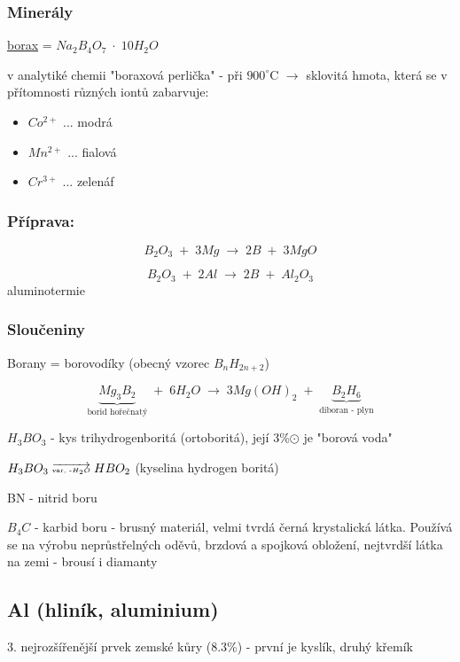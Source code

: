 \subsubsection{Minerály}

\underline{borax} = $Na_2B_4O_7 \; \cdot \; 10H_2O$

v analytiké chemii "boraxová perlička" - při $900^\circ$C $\rightarrow$ sklovitá hmota,
která se v přítomnosti různých iontů zabarvuje:
\begin{itemize}
    \item $Co^{2+}$ ... modrá
    \item $Mn^{2+}$ ... fialová
    \item $Cr^{3+}$ ... zelenáf
\end{itemize}

\subsubsection*{Příprava:}
\[B_2O_3 \; + \; 3Mg \; \longrightarrow \; 2B \; + \; 3MgO\]

\[B_2O_3 \; + \; 2Al \; \longrightarrow \; 2B \; + \; Al_2O_3\] \centering aluminotermie

\raggedright
\subsubsection*{Sloučeniny}
Borany = borovodíky (obecný vzorec $B_nH_{2n+2}$)

\[\underbrace{Mg_3B_2}_\text{borid hořečnatý} \; + \; 6H_2O \; \longrightarrow \; 3Mg\left(OH\right)_2 \; + \; \underbrace{B_2H_6}_\text{diboran - plyn}\]
\smallskip

$H_3BO_3$ - kys trihydrogenboritá (ortoboritá), její 3\%$\odot$ je "borová voda"
\smallskip

$H_3BO_3 \; \overrightarrow{\text{\tiny{var, -$H_2O$}}} \; HBO_2$ (kyselina hydrogen boritá)
\smallskip

BN - nitrid boru
\smallskip

$B_4C$ - karbid boru - brusný materiál, velmi tvrdá černá krystalická látka.
Používá se na výrobu neprůstřelných oděvů, brzdová a spojková obložení, nejtvrdší látka na zemi - brousí i diamanty

\subsection{Al (hliník, aluminium)}
\smallskip

3. nejrozšířenější prvek zemské kůry (8.3\%) - první je kyslík, druhý křemík
\smallskip

